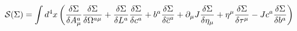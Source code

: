 \begin{equation}
\mathcal{S}(\Sigma )=\int d^{4}x\left( \frac{\delta \Sigma }{\delta A_{\mu
}^{a}}\frac{\delta \Sigma }{\delta \Omega ^{a\mu }}+\frac{\delta \Sigma }{%
\delta L^{a}}\frac{\delta \Sigma }{\delta c^{a}}+b^{a}\frac{\delta \Sigma }{%
\delta \overline{c}^{a}}+\partial _{\mu }J\frac{\delta \Sigma }{\delta \eta
_{\mu }}+\eta ^{\mu }\frac{\delta \Sigma }{\delta \tau ^{\mu }}-Jc^{a}\frac{%
\delta \Sigma }{\delta b^{a}}\right)   \label{sto}
\end{equation}

